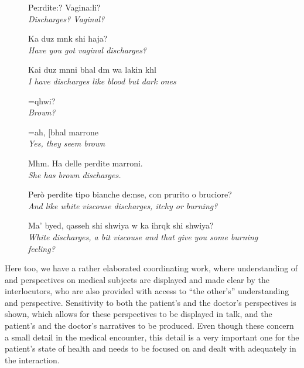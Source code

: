 \documentclass[output=paper]{LSP/langsci}
\begin{document}
\begin{figure} 
	\begin{varwidth}{\textwidth}
	\begin{description}[align=left, nosep, style=nextline, leftmargin=3em, format=\normalfont\footnotesize]
	\item [57 \hspace{0.3em} D:] Pe:rdite:? Vagina:li? \\ \textit{Discharges? Vaginal?}
	\item [58 \hspace{0.3em} M:] Ka duz mnk shi haja? \\ \textit{Have you got vaginal discharges?}
	\item [59 \hspace{0.3em} P:] Kai duz mnni bhal dm wa lakin khl \\ \textit{I have discharges like blood but dark ones}
	\item [60 \hspace{0.3em} M:] =qhwi? \\ \textit{Brown?}
	\item [61 \hspace{0.3em} P:] =ah, [bhal marrone \\ \textit{Yes, they seem brown} 
    \item [62 \hspace{0.3em} M:] [Ah. \\ \textit{Yes.}
    \item [63 \hspace{0.3em} M:] Mhm. Ha delle perdite marroni. \\ \textit{She has brown discharges.}
    \item [64 \hspace{0.3em} D:]  Però perdite tipo bianche de:nse, con prurito o bruciore? \\ \textit{And like white viscouse discharges, itchy or burning?}
    \item [65 \hspace{0.3em} M:]  Ma' byed, qasseh shi shwiya w ka ihrqk shi shwiya? \\ \textit{White discharges, a bit viscouse and that give you some burning feeling?} 
	\end{description}
    \end{varwidth}
\caption{}
\label{baraldi-gavioli:extract:4}
\end{figure}

Here too, we have a rather elaborated coordinating work, where understanding of and perspectives on medical subjects are displayed and made clear by the interlocutors, who are also provided with access to ``the other's'' understanding and perspective. Sensitivity to both the patient's and the doctor's perspectives is shown, which allows for these perspectives to be displayed in talk, and the patient's and the doctor's narratives to be produced. Even though these concern a small detail in the medical encounter, this detail is a very important one for the patient's state of health and needs to be focused on and dealt with adequately in the interaction.
\end{document}
